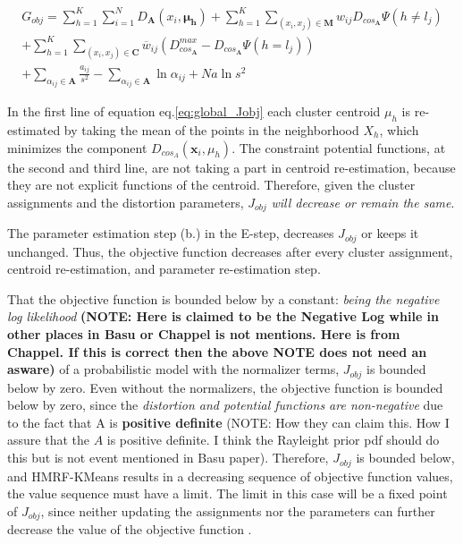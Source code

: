 \documentclass[dvips,dvipdfm,pdftex]{llncs}
\begin{document}
\begin{equation}
	\begin{split}
		G_{obj}=\sum_{h=1}^{K}\sum_{i=1}^{N}D_{\mathbf{A}}(x_{i},\mathbf{\mu}_{\mathbf{h}})
		+\sum_{h=1}^{K}\sum_{(x_{i},x_{j})\in\mathbf{M}}w_{ij}D_{cos_{\mathbf{A}}}\Psi(h\neq l_{j}) \\
		+\sum_{h=1}^{K}\sum_{(x_{i},x_{j})\in\mathbf{C}}\overline{w}_{ij}(D_{cos_{\mathbf{A}}}^{max}-D_{cos_{\mathbf{A}}}\Psi(h=l_{j})) \\
		+\sum_{\alpha_{ij}\in\mathbf{A}}\frac{a_{ij}}{s^{2}}-\sum_{\alpha_{ij}\in\mathbf{A}}\ln\alpha_{ij}+ \mathit{Na} \ln s^{2}
	\end{split}
\label{eq:global_Jobj}
\end{equation}

In the first line of equation eq.\ref{eq:global_Jobj} each cluster centroid $μ_{h}$ is re-estimated by taking the mean of the points in the neighborhood $X_{h}$, which minimizes the component $D_{cos_{A}}(\mathbf{x}_{i},\mu_{h})$. The constraint potential functions, at the second and third line, are not taking a part in centroid re-estimation, because they are not explicit functions of the centroid. Therefore, given the cluster assignments and the distortion parameters, $J_{obj}$ \emph{will decrease or remain the same}.

The parameter estimation step (b.) in the E-step, decreases $J_{obj}$ or keeps it unchanged. Thus, the objective function decreases after every cluster assignment, centroid re-estimation, and parameter re-estimation step.

That the objective function is bounded below by a constant: \emph{being the negative log likelihood} \textbf{(NOTE: Here is claimed to be the Negative Log while in other places in Basu or Chappel is not mentions. Here is from Chappel. If this is correct then the above NOTE does not need an asware)} of a probabilistic model with the normalizer terms, $J_{obj}$ is bounded below by zero. Even without the normalizers, the objective function is bounded below by zero, since the \emph{distortion and potential functions are non-negative} due to the fact that A is \textbf{positive definite} (NOTE: How they can claim this. How I assure that the $A$ is positive definite. I think the Rayleight prior pdf should do this but is not event mentioned in Basu paper). Therefore, $J_{obj}$ is bounded below, and HMRF-KMeans results in a decreasing sequence of objective function values, the value sequence must have a limit. The limit in this case will be a fixed point of $J_{obj}$, since neither updating the assignments nor the parameters can further decrease the value of the objective function \cite{chapelle2006semi_hmrf_kmeans}.
\end{document}
